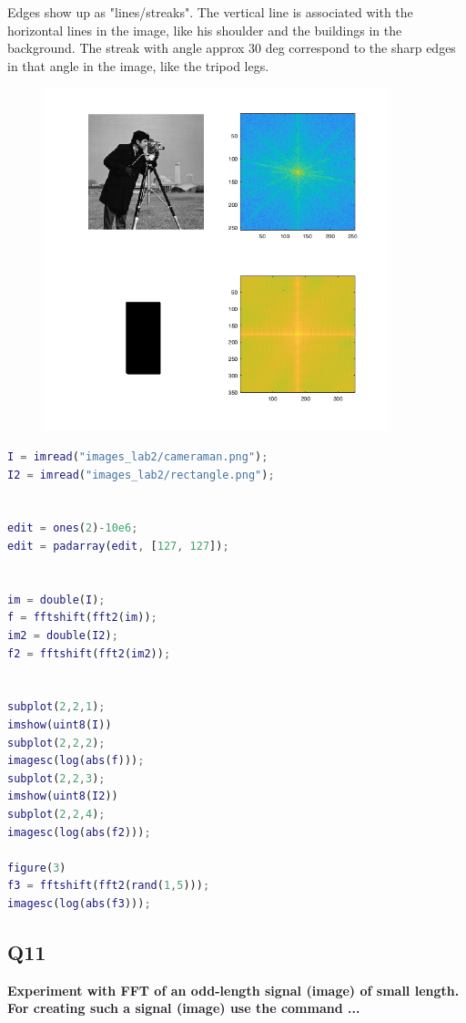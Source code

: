 \documentclass[oneside,a4paper]{article}
\begin{document}
\noindent Edges show up as "lines/streaks". The vertical line is associated with the horizontal lines in the image, like his shoulder and the buildings in the background. The streak with angle approx 30 deg correspond to the sharp edges in that angle in the image, like the tripod legs. 

\begin{figure}[ht!]
\centering
\includegraphics[width=100mm]{figures/Q10.png}
\caption{}
\label{fig:Q10}
\end{figure}

\begin{lstlisting}[language=MATLAB]
I = imread("images_lab2/cameraman.png");
I2 = imread("images_lab2/rectangle.png");


edit = ones(2)-10e6;
edit = padarray(edit, [127, 127]);


im = double(I);
f = fftshift(fft2(im));
im2 = double(I2);
f2 = fftshift(fft2(im2));


subplot(2,2,1);
imshow(uint8(I))
subplot(2,2,2);
imagesc(log(abs(f)));
subplot(2,2,3);
imshow(uint8(I2))
subplot(2,2,4);
imagesc(log(abs(f2)));

figure(3)
f3 = fftshift(fft2(rand(1,5)));
imagesc(log(abs(f3))); 
\end{lstlisting}


\subsection*{Q11}
\noindent \textbf{Experiment with FFT of an odd-length signal (image) of small length. For creating such a signal (image) use the command ... }
\end{document}
